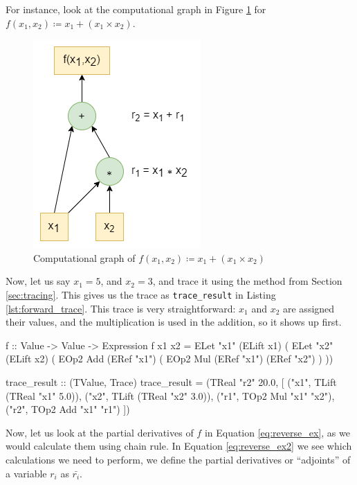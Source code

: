     For instance, look at the computational graph in Figure \ref{fig:forward_graph} for $f(x_1,x_2)\coloneqq x_1+(x_1\times x_2)$.
    \begin{figure}[htb]
        \centering
        \includegraphics[scale=0.5]{diagrams/forward_example.png}
        \caption{Computational graph of $f(x_1,x_2)\coloneqq x_1+(x_1\times x_2)$}
        \label{fig:forward_graph}
    \end{figure}
    Now, let us say $x_1=5$, and $x_2=3$, and trace it using the method from Section \ref{sec:tracing}.
    This gives us the trace as \texttt{trace\_result} in Listing \ref{lst:forward_trace}.
    This trace is very straightforward: $x_1$ and $x_2$ are assigned their values, and the multiplication is used in the addition, so it shows up first.
    \begin{haskell}[caption=DSL definition of $f$ and its trace, label=lst:forward_trace, gobble=8]
        f :: Value -> Value -> Expression
        f x1 x2 = ELet "x1" (ELift x1) (
            ELet "x2" (ELift x2) (
                EOp2 Add (ERef "x1") (
                    EOp2 Mul (ERef "x1") (ERef "x2")
                )
            ))

        trace_result :: (TValue, Trace)
        trace_result = (TReal "r2" 20.0, [
            ("x1", TLift (TReal "x1" 5.0)),
            ("x2", TLift (TReal "x2" 3.0)),
            ("r1", TOp2 Mul "x1" "x2"),
            ("r2", TOp2 Add "x1" "r1")
        ])
    \end{haskell}
    Now, let us look at the partial derivatives of $f$ in Equation \ref{eq:reverse_ex}, as we would calculate them using chain rule.
    In Equation \ref{eq:reverse_ex2} we see which calculations we need to perform, we define the partial derivatives or ``adjoints'' of a variable $r_i$ as $\bar{r_i}$.
